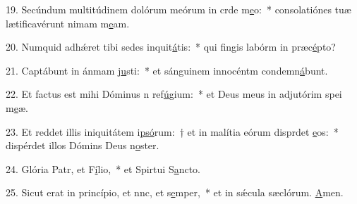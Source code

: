 19. Secúndum multitúdinem dolórum meórum in crde m\uline{e}o:~* consolatiónes tuæ lætificavérunt nimam m\uline{e}am.\par 
20. Numquid adhǽret tibi sedes inquit\uline{á}tis:~* qui fingis labórm in præc\uline{é}pto?\par 
21. Captábunt in ánmam j\uline{u}sti:~* et sánguinem innocéntm condemn\uline{á}bunt.\par 
22. Et factus est mihi Dóminus n ref\uline{ú}gium:~* et Deus meus in adjutórim spei m\uline{e}æ.\par 
23. Et reddet illis iniquitátem i\uline{psó}rum:~† et in malítia eórum disprdet \uline{e}os:~* dispérdet illos Dómins Deus n\uline{o}ster.\par 
24. Glória Patr, et F\uline{í}lio,~* et Spirtui S\uline{a}ncto.\par 
25. Sicut erat in princípio, et nnc, et s\uline{e}mper,~* et in sǽcula sæclórum. \uline{A}men.\par 
